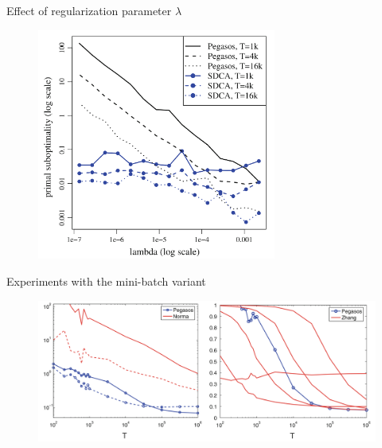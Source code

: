 \begin{frame}{Effect of regularization parameter $\lambda$}
    \begin{figure}[htbp]
        \centering
        \includegraphics[height=0.7\textheight, width=0.7\textwidth]{images/comp_T.png}
    \end{figure}
\end{frame}

\begin{frame}{Experiments with the mini-batch variant}
    \begin{figure}[htbp]
        \centering
        \includegraphics[height=0.7\textheight, width=\textwidth]{images/comp_k.png}
    \end{figure}
\end{frame}


